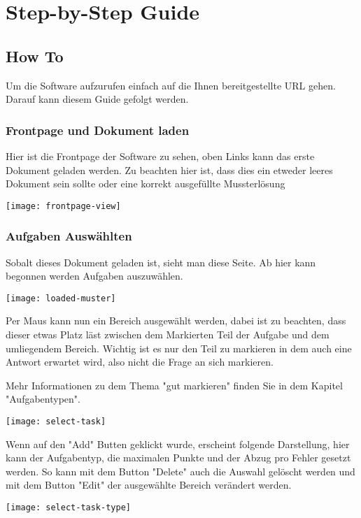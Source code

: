 \chapter{Step-by-Step Guide}

\section{How To}
Um die Software aufzurufen einfach auf die Ihnen bereitgestellte URL gehen.
Darauf kann diesem Guide gefolgt werden.

\subsection{Frontpage und Dokument laden}

Hier ist die Frontpage der Software zu sehen, oben Links kann das erste Dokument geladen werden.
Zu beachten hier ist, dass dies ein etweder leeres Dokument sein sollte oder eine korrekt ausgef\"ullte Mussterl\"osung

\texttt{[image: frontpage-view]}

\subsection{Aufgaben Ausw\"ahlten}

Sobalt dieses Dokument geladen ist, sieht man diese Seite. 
Ab hier kann begonnen werden Aufgaben auszuw\"ahlen.

\texttt{[image: loaded-muster]}

Per Maus kann nun ein Bereich ausgew\"ahlt werden, dabei ist zu beachten, dass dieser etwas Platz l\"ast zwischen dem Markierten Teil der Aufgabe und dem umliegendem Bereich.
Wichtig ist es nur den Teil zu markieren in dem auch eine Antwort erwartet wird, also nicht die Frage an sich markieren.

Mehr Informationen zu dem Thema "gut markieren" finden Sie in dem Kapitel "Aufgabentypen".

\texttt{[image: select-task]}

Wenn auf den "Add" Butten geklickt wurde, erscheint folgende Darstellung, hier kann der Aufgabentyp, die maximalen Punkte und der Abzug pro Fehler gesetzt werden.
So kann mit dem Button "Delete" auch die Auswahl gel\"oscht werden und mit dem Button "Edit" der ausgew\"ahlte Bereich ver\"andert werden.

\texttt{[image: select-task-type]}

